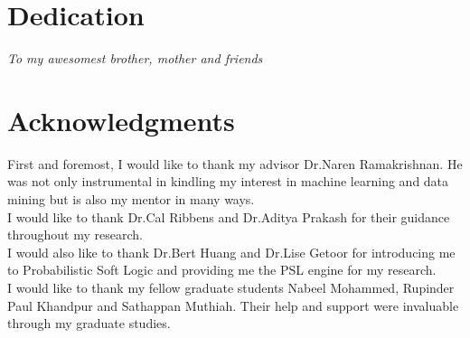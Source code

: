 \documentclass[11pt]{report}
\begin{document}
\chapter*{Dedication}
\vspace*{\fill}
\begin{center}
\Large\textit{To my awesomest brother, mother and friends}
\end{center}
\vspace{\fill}

\chapter*{Acknowledgments}
\vspace*{\fill}
\Large{First and foremost, I would like to thank my advisor Dr.Naren Ramakrishnan. He was not only instrumental in kindling my interest in machine learning and data mining but is also my mentor in many ways.\\
I would like to thank Dr.Cal Ribbens and Dr.Aditya Prakash for their guidance throughout my research.\\
I would also like to thank Dr.Bert Huang and Dr.Lise Getoor for introducing me to Probabilistic Soft Logic and providing me the PSL engine for my research.\\
I would like to thank my fellow graduate students Nabeel Mohammed, Rupinder Paul Khandpur and Sathappan Muthiah. Their help and support were invaluable through my graduate studies.
}
\vspace{\fill}

\tableofcontents
\pagebreak

\listoffigures
\pagebreak

\listoftables
\pagebreak

\pagestyle{myheadings}









%
%

%

\end{document}
